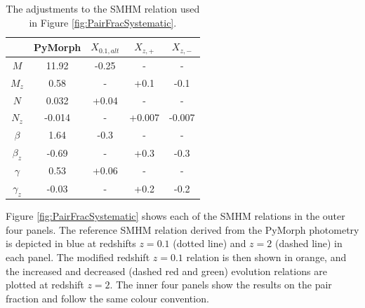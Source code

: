 \begin{table}
\centering
\caption{The adjustments to the SMHM relation used in Figure \ref{fig:PairFracSystematic}.}
\label{tab:PairFracSysInput}
\begin{tabular}{|c|cccc|} \hline
             & PyMorph   & $X_{0.1, alt}$  & $X_{z, +}$  & $X_{z, -}$  \\ \hline
$M$          & 11.92 & -0.25 & -     & -     \\ 
$M_{z}$      & 0.58   & -     & +0.1  & -0.1  \\ \hline
$N$          & 0.032 & +0.04 & -     & -     \\
$N_{z}$      & -0.014 & -     & +0.007 & -0.007 \\ \hline
$\beta$      & 1.64  & -0.3  & -     & -     \\
$\beta_{z}$  & -0.69  & -     & +0.3  & -0.3  \\ \hline
$\gamma$     & 0.53  & +0.06 & -     & -     \\
$\gamma_{z}$ & -0.03  & -     & +0.2  & -0.2  \\ \hline
\end{tabular}
\end{table}

Figure \ref{fig:PairFracSystematic} shows each of the SMHM relations in the outer four panels. The reference SMHM relation derived from the PyMorph photometry is depicted in blue at redshifts $z = 0.1$ (dotted line) and $z = 2$ (dashed line) in each panel. The modified redshift $z = 0.1$ relation is then shown in orange, and the increased and decreased (dashed red and green) evolution relations are plotted at redshift $z = 2$. The inner four panels show the results on the pair fraction and follow the same colour convention. 

